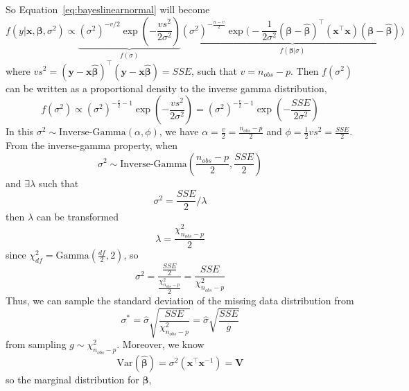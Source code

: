 \documentclass[preprint,12pt]{elsarticle}
\begin{document}
So Equation~\ref{eq:bayeslinearnormal} will become 
\begin{equation} 
    f(y|\mathbf{x}, \boldsymbol{\beta}, \sigma^2)\propto \underbrace{(\sigma^2)^{-v/2}\exp (-\frac{vs^2}{2\sigma^2})}_{f(\sigma)}\underbrace{(\sigma^2)^{-\frac{n-v}{2}}\exp \Big (-\frac{1}{2\sigma^2}(\boldsymbol{\beta}-\hat{\boldsymbol{\beta}})^{\top}(\mathbf{x}^{\top}\mathbf{x})(\boldsymbol{\beta}-\hat{\boldsymbol{\beta}})\Big )}_{f(\boldsymbol{\beta}|\sigma)}
\end{equation}
where $vs^2=(\mathbf{y}-\mathbf{x}\hat{\boldsymbol{\beta}})^{\top}(\mathbf{y}-\mathbf{x}\hat{\boldsymbol{\beta}})=SSE$, such that $v=n_{obs}-p$. 
Then $f(\sigma^2)$ can be written as a proportional density to the inverse gamma distribution,
\begin{equation} 
    f(\sigma^2)\propto (\sigma^2)^{-\frac{v}{2}-1}\exp (-\frac{vs^2}{2\sigma^2})=(\sigma^2)^{-\frac{v}{2}-1}\exp (-\frac{SSE}{2\sigma^2})
\end{equation}
In this $\sigma^2\sim \text{Inverse-Gamma}(\alpha, \phi)$, we have $\alpha = \frac{v}{2}=\frac{n_{obs}-p}{2}$ and $\phi = \frac{1}{2}vs^2=\frac{SSE}{2}$.
From the inverse-gamma property, when 
\begin{equation} 
    \sigma^2\sim \text{Inverse-Gamma}(\frac{n_{obs}-p}{2}, \frac{SSE}{2})
\end{equation}
and $\exists\lambda$ such that 
\begin{equation} 
    \sigma^2=\frac{SSE}{2}/\lambda
\end{equation}
then $\lambda$ can be transformed 
\begin{equation} 
    \lambda = \frac{\chi^2_{n_{obs}-p}}{2}
\end{equation}
since $\chi^2_{df}=\text{Gamma}(\frac{df}{2},2)$, so 
\begin{equation} 
    \sigma^2=\frac{\frac{SSE}{2}}{\frac{\chi^2_{n_{obs}-p}}{2}}=\frac{SSE}{\chi^2_{n_{obs}-p}}
\end{equation}
Thus, we can sample the standard deviation of the missing data distribution from 
\begin{equation} 
    \sigma^*=\hat{\sigma}\sqrt{\frac{SSE}{\chi^2_{n_{obs}-p}}}=\hat{\sigma}\sqrt{\frac{SSE}{g}}
\end{equation}
from sampling $g\sim \chi^2_{n_{obs}-p}$. 
Moreover, we know 
\begin{equation} 
    \text{Var}(\hat{\boldsymbol{\beta}})=\sigma^2(\mathbf{x}^{\top}\mathbf{x}^{-1})=\mathbf{V}
\end{equation}
so the marginal distribution for $\boldsymbol{\beta}$, 
\end{document}
